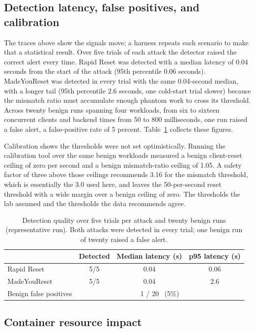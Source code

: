 \documentclass[a4paper,fleqn]{cas-dc}
\begin{document}
\subsection{Detection latency, false positives, and calibration}\label{sec:eval-quality}

The traces above show the signals move; a harness repeats each scenario to make that a statistical result. Over five trials of each attack the detector raised the correct alert every time. Rapid Reset was detected with a median latency of 0.04 seconds from the start of the attack (95th percentile 0.06 seconds). MadeYouReset was detected in every trial with the same 0.04-second median, with a longer tail (95th percentile 2.6 seconds, one cold-start trial slower) because the mismatch ratio must accumulate enough phantom work to cross its threshold. Across twenty benign runs spanning four workloads, from six to sixteen concurrent clients and backend times from 50 to 800 milliseconds, one run raised a false alert, a false-positive rate of 5 percent. Table~\ref{tab:quality} collects these figures.

Calibration shows the thresholds were not set optimistically. Running the calibration tool over the same benign workloads measured a benign client-reset ceiling of zero per second and a benign mismatch-ratio ceiling of 1.05. A safety factor of three above those ceilings recommends 3.16 for the mismatch threshold, which is essentially the 3.0 used here, and leaves the 50-per-second reset threshold with a wide margin over a benign ceiling of zero. The thresholds the lab assumed and the thresholds the data recommends agree.

\begin{table}[tp]
\centering
\small
\caption{Detection quality over five trials per attack and twenty benign runs (representative run). Both attacks were detected in every trial; one benign run of twenty raised a false alert.}
\label{tab:quality}
\begin{tabular}{@{}lccc@{}}
\toprule
 & Detected & Median latency (s) & p95 latency (s) \\
\midrule
Rapid Reset  & 5/5 & 0.04 & 0.06 \\
MadeYouReset & 5/5 & 0.04 & 2.6 \\
\midrule
Benign false positives & \multicolumn{3}{c}{1 / 20 \ (5\%)} \\
\bottomrule
\end{tabular}
\end{table}

\subsection{Container resource impact}\label{sec:eval-container}
\end{document}
